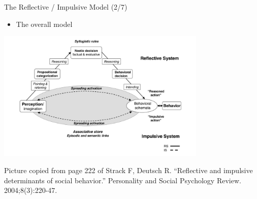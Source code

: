 \documentclass{beamer}
\begin{document}
\begin{frame}
{\centerline{The Reflective / Impulsive Model (2/7)}}
\begin{itemize}
    \item The overall model
\end{itemize} 

\begin{center}

 \includegraphics[width=10cm]{P2023.AIBCCSS.KnowledgeAcquisitionRetentionUse/RI.HowItWorks.jpg}
 
 \end{center}


\begin{center}
    \tiny{Picture copied from page 222 of Strack F, Deutsch R. ``Reflective and impulsive determinants of social behavior.'' Personality and Social Psychology Review. 2004;8(3):220-47.}
    \end{center}

\end{frame}
\end{document}
